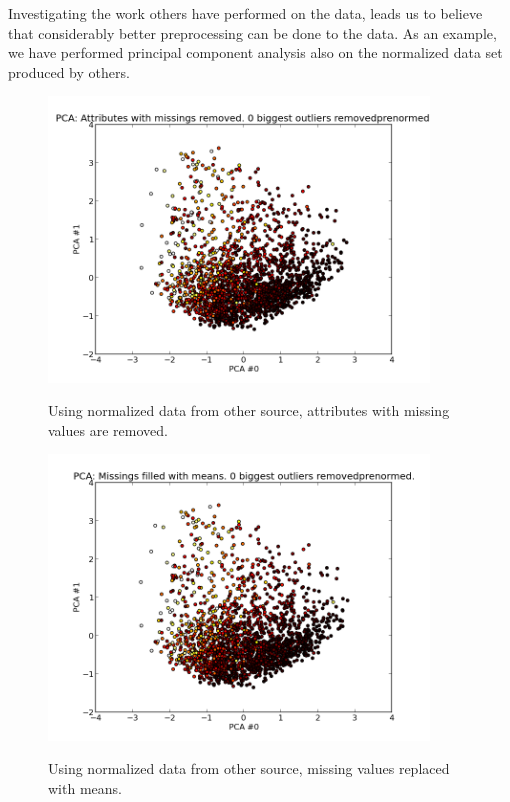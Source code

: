 Investigating the work others have performed on the data, leads us to believe that considerably better preprocessing can be done to the data. As an example, we have performed principal component analysis also on the normalized data set produced by others.

\begin{figure}[H]
\centering
\includegraphics[width=0.9\textwidth]{pca/attr-with-missings-removed_0-biggest-outliers-removed_prenormed_}
\label{fig:prenorm_attrrem_0out}
\caption{Using normalized data from other source, attributes with missing values are removed.}
\end{figure}

\begin{figure}[H]
\centering
\includegraphics[width=0.9\textwidth]{pca/missings-filled-w-means_0-biggest-outliers-removed_prenormed_}
\label{fig:prenorm_attrrem_0out}
\caption{Using normalized data from other source, missing values replaced with means.}
\end{figure}

